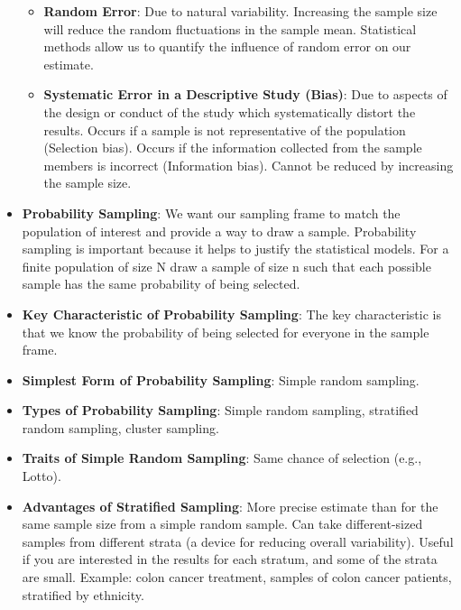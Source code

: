 \documentclass[12pt]{book}
\begin{document}
\begin{itemize}

    \begin{itemize}
    \item \textbf{Random Error}: Due to natural variability. Increasing the sample size will reduce the random fluctuations in the sample mean. Statistical methods allow us to quantify the influence of random error on our estimate.
    \item \textbf{Systematic Error in a Descriptive Study (Bias)}: Due to aspects of the design or conduct of the study which systematically distort the results. Occurs if a sample is not representative of the population (Selection bias). Occurs if the information collected from the sample members is incorrect (Information bias). Cannot be reduced by increasing the sample size.
    \end{itemize}
\item \textbf{Probability Sampling}: We want our sampling frame to match the population of interest and provide a way to draw a sample. Probability sampling is important because it helps to justify the statistical models. For a finite population of size N draw a sample of size n such that each possible sample has the same probability of being selected.
\item \textbf{Key Characteristic of Probability Sampling}: The key characteristic is that we know the probability of being selected for everyone in the sample frame.
\item \textbf{Simplest Form of Probability Sampling}: Simple random sampling.
\item \textbf{Types of Probability Sampling}: Simple random sampling, stratified random sampling, cluster sampling.
\item \textbf{Traits of Simple Random Sampling}: Same chance of selection (e.g., Lotto).
\item \textbf{Advantages of Stratified Sampling}: More precise estimate than for the same sample size from a simple random sample. Can take different-sized samples from different strata (a device for reducing overall variability). Useful if you are interested in the results for each stratum, and some of the strata are small. Example: colon cancer treatment, samples of colon cancer patients, stratified by ethnicity.

\end{itemize}
\end{document}
